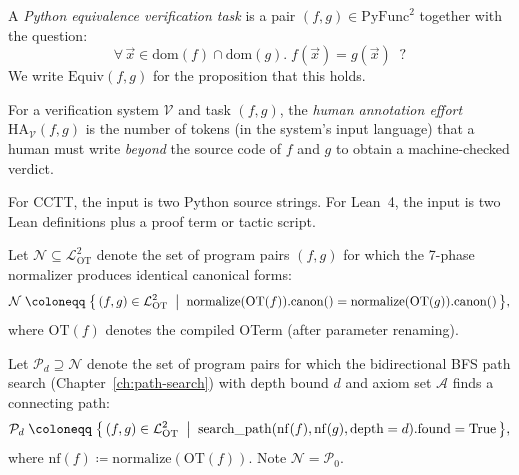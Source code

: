 \begin{definition}
\label{def:verification-task}
A \emph{Python equivalence verification task} is a pair
$(f, g) \in \mathrm{PyFunc}^2$ together with the question:
\[
  \forall\, \vec{x} \in \mathrm{dom}(f) \cap \mathrm{dom}(g).\;
  f(\vec{x}) = g(\vec{x}) \;\;?
\]
We write $\mathrm{Equiv}(f, g)$ for the proposition that this holds.
\end{definition}

\begin{definition}
\label{def:annotation-effort}
For a verification system $\mathcal{V}$ and task $(f,g)$, the
\emph{human annotation effort} $\mathrm{HA}_{\mathcal{V}}(f,g)$ is
the number of tokens (in the system's input language) that a human
must write \emph{beyond} the source code of $f$ and $g$ to obtain a
machine-checked verdict.

For CCTT, the input is two Python source strings.  For Lean~4, the
input is two Lean definitions plus a proof term or tactic script.
\end{definition}

\begin{definition}
\label{def:normalizer-decidable}
Let $\mathcal{N} \subseteq \mathcal{L}_{\mathrm{OT}}^2$ denote the
set of program pairs $(f,g)$ for which the 7-phase normalizer
produces identical canonical forms:
\[
  \mathcal{N}
  \;\coloneqq\;
  \bigl\{\, (f, g) \in \mathcal{L}_{\mathrm{OT}}^2
  \;\bigm|\;
  \mathrm{normalize}(\mathrm{OT}(f)).\mathrm{canon}()
  =
  \mathrm{normalize}(\mathrm{OT}(g)).\mathrm{canon}()
  \,\bigr\},
\]
where $\mathrm{OT}(f)$ denotes the compiled OTerm (after parameter
renaming).
\end{definition}

\begin{definition}
\label{def:path-decidable}
Let $\mathcal{P}_d \supseteq \mathcal{N}$ denote the set of program
pairs for which the bidirectional BFS path search
(Chapter~\ref{ch:path-search}) with depth bound $d$ and axiom set
$\mathcal{A}$ finds a connecting path:
\[
  \mathcal{P}_d
  \;\coloneqq\;
  \bigl\{\, (f, g) \in \mathcal{L}_{\mathrm{OT}}^2
  \;\bigm|\;
  \mathrm{search\_path}(\mathrm{nf}(f), \mathrm{nf}(g),
    \text{depth}=d).\mathrm{found} = \mathrm{True}
  \,\bigr\},
\]
where $\mathrm{nf}(f) \coloneqq \mathrm{normalize}(\mathrm{OT}(f))$.
Note $\mathcal{N} = \mathcal{P}_0$.
\end{definition}


